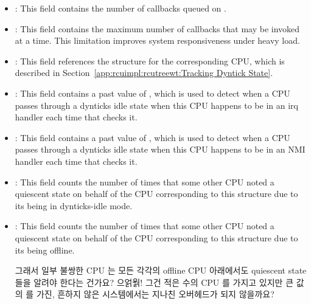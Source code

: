 \begin{itemize}
\item	{}:
	This field contains the number of callbacks queued on
	.
\item	{}:
	This field contains the maximum number of callbacks that may
	be invoked at a time.
	This limitation improves system responsiveness under heavy load.
\item	{}:
	This field references the  structure for
	the corresponding CPU, which is described in
	Section~\ref{app:rcuimpl:rcutreewt:Tracking Dyntick State}.
\item	{}:
	This field contains a past value of ,
	which is used to detect when a CPU passes through a dynticks
	idle state when this CPU happens to be in an irq
	handler each time that  checks it.
\item	{}:
	This field contains a past value of ,
	which is used to detect when a CPU passes through a dynticks
	idle state when this CPU happens to be in an NMI
	handler each time that  checks it.
\item	{}:
	This field counts the number of times that some other CPU noted
	a quiescent state on behalf of
	the CPU corresponding to this  structure due to
	its being in dynticks-idle mode.
\item	{}:
	This field counts the number of times that some other CPU noted
	a quiescent state on behalf of
	the CPU corresponding to this  structure due to
	its being offline.
\fi

\QuickQuiz{}
	그래서 일부 불쌍한 CPU 는 모든 각각의 offline CPU 아래에서도 quiescent
	state 들을 알려야 한다는 건가요?
	으얽웕!
	그건 적은 수의 CPU 를 가지고 있지만 큰 값의  를 가진,
	흔하지 않은 시스템에서는 지나친 오버헤드가 되지 않을까요?
	\iffalse

	So some poor CPU has to note quiescent states on behalf of
	each and every offline CPU?
	Yecch!
	Won't that result in excessive overheads in the not-uncommon
	case of a system with a small number of CPUs but a large value
	for \co{NR_CPUS}?
	\fi
{}
\end{itemize}
